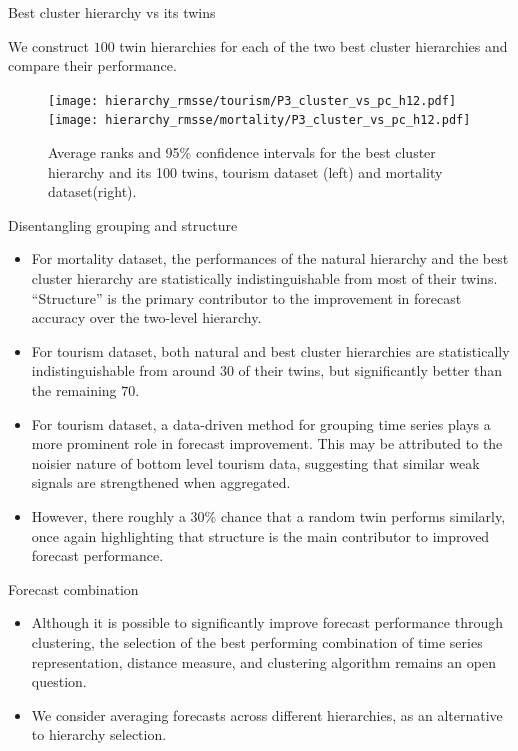 \documentclass[aspectratio=169]{beamer}
\begin{document}
\begin{frame}{Best cluster hierarchy vs its twins}

	We construct $100$ twin hierarchies for each of the two best cluster hierarchies and compare their performance.
	
	\begin{figure}
		\centering
		\texttt{[image: hierarchy\_rmsse/tourism/P3\_cluster\_vs\_pc\_h12.pdf]}
		\texttt{[image: hierarchy\_rmsse/mortality/P3\_cluster\_vs\_pc\_h12.pdf]}
		\caption{Average ranks and 95\% confidence intervals for the best cluster hierarchy and its 100 twins, tourism dataset (left) and mortality dataset(right).}
	\end{figure}
		
	\end{frame}

\begin{frame}{Disentangling grouping and structure}
	\begin{itemize}
		\item For mortality dataset,  the performances of the natural hierarchy and the best cluster hierarchy are statistically {\color{red} indistinguishable from most of their twins}. {\color{red} ``Structure'' is the primary contributor} to the improvement in forecast accuracy over the two-level hierarchy.
		\item For tourism dataset, both natural and best cluster hierarchies are  statistically indistinguishable from around $30$ of their twins, but significantly better than the remaining $70$.
		\item For tourism dataset, {\color{red} a data-driven method} for grouping time series plays {\color{red} a more prominent role} in forecast improvement. This may be attributed to the noisier nature of bottom level tourism data, suggesting that similar weak signals are strengthened when aggregated.
		\item However, there roughly a {\color{red} 30\% chance that a random twin performs similarly}, once again highlighting that structure is the main contributor to improved forecast performance.
	\end{itemize}
\end{frame}


\begin{frame}{Forecast combination}
	\begin{itemize}
		\item Although it is possible to significantly improve forecast performance through clustering, the {\color{red} selection of the best performing combination} of time series representation, distance measure, and clustering algorithm remains an open question.
		\item We consider {\color{red} averaging forecasts across different hierarchies}, as an alternative to hierarchy selection.
	\end{itemize}
\end{frame}
\end{document}
